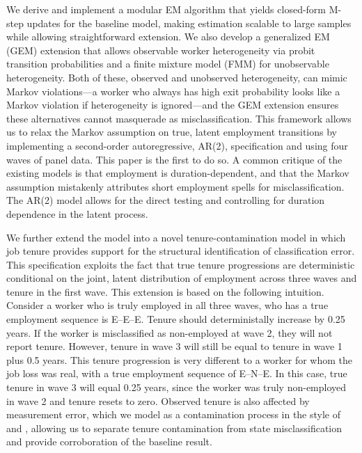 We derive and implement a modular EM algorithm that yields closed-form
M-step updates for the baseline model, making estimation scalable to large
samples while allowing straightforward extension. We also develop a
generalized EM (GEM) extension that allows observable worker heterogeneity via
probit transition probabilities and a finite mixture model (FMM) for unobservable
heterogeneity. Both of these, observed and unobserved heterogeneity,
 can mimic Markov violations---a worker who always
has high exit probability looks like a Markov violation if heterogeneity is
ignored---and the GEM extension ensures these alternatives cannot masquerade as
misclassification. This framework allows us to relax the Markov assumption on
true, latent employment transitions by implementing a second-order autoregressive, AR(2),
specification and using four waves of panel data. This paper is the first to do so. 
A common critique of the existing models
is that employment is duration-dependent, and that the Markov assumption mistakenly
attributes short employment spells for misclassification. The AR(2) model allows for 
the direct testing and controlling for duration dependence in the latent process. 

We further extend the model into a novel tenure-contamination model in 
which job tenure provides support for the structural identification
of classification error. This specification exploits the fact that true tenure 
progressions are deterministic conditional on the joint, latent distribution
of employment across three waves and tenure in the first wave. 
This extension is based on the following intuition. 
Consider a worker who is truly employed in all three waves, who has a 
true employment sequence is E--E--E. Tenure should deterministally increase by 0.25 years. 
If the worker is misclassified as non-employed at wave 2, they will not report tenure. 
However, tenure in wave 3 will still be equal to tenure in wave 1 plus 0.5 years.
This tenure progression is very different to a worker for whom the job loss was real, 
with a true employment sequence of E--N--E. In this case, true tenure in wave 3 will 
equal 0.25 years, since the worker was truly non-employed in wave 2 and tenure resets to zero.
Observed tenure is also affected by measurement error, which we model as a contamination process
in the style of \citet{goldstein1982contamination} and \citet{horowitz1995identification}, 
allowing us to separate tenure contamination from state misclassification and 
provide corroboration of the baseline result.

